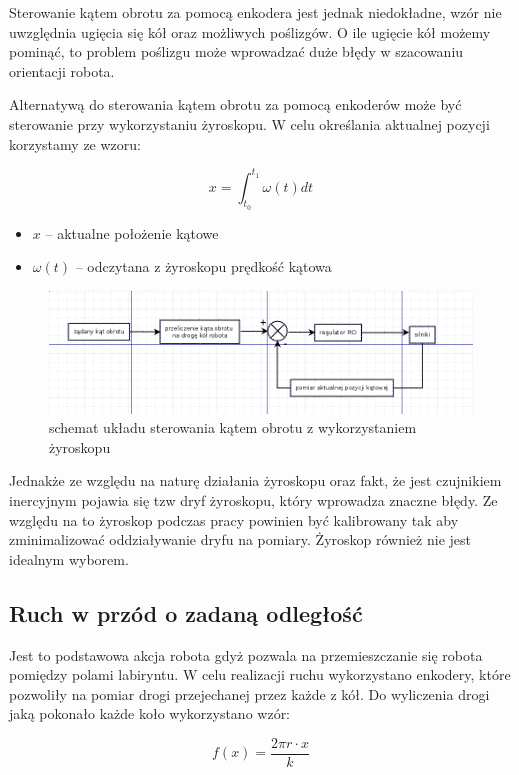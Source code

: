 \documentclass[12pt,a4paper,twoside,openright,fleqn]{mwrep}
\begin{document}
Sterowanie kątem obrotu za pomocą enkodera jest jednak niedokładne, wzór nie uwzględnia ugięcia się kół oraz możliwych poślizgów. O ile ugięcie kół możemy pominąć, to problem poślizgu może wprowadzać duże błędy w szacowaniu orientacji robota. 

Alternatywą do sterowania kątem obrotu za pomocą enkoderów może być sterowanie przy wykorzystaniu żyroskopu. W celu określania aktualnej pozycji korzystamy ze wzoru:

$$ x = \int_{t_0}^{t_1} \omega(t) dt $$

\begin{itemize}
   \item $x$ -- aktualne położenie kątowe
   \item $\omega(t)$ -- odczytana z żyroskopu prędkość kątowa
\end{itemize}

\begin{figure}[h]
\centering
\includegraphics[width=1.0\textwidth]{./images/zyroskop_uklad_sterowania}
\caption{schemat układu sterowania kątem obrotu z wykorzystaniem żyroskopu}
\label{zyroskop_uklad_sterowania}
\end{figure}

Jednakże ze względu na naturę działania żyroskopu oraz fakt, że jest czujnikiem inercyjnym pojawia się tzw dryf żyroskopu, który wprowadza znaczne błędy. Ze względu na to żyroskop podczas pracy powinien być kalibrowany tak aby zminimalizować oddziaływanie dryfu na pomiary. Żyroskop również nie jest idealnym wyborem. 


\subsection{Ruch w przód o zadaną odległość} %

Jest to podstawowa akcja robota gdyż pozwala na przemieszczanie się robota pomiędzy polami labiryntu. W celu realizacji ruchu wykorzystano enkodery, które pozwoliły na pomiar drogi przejechanej przez każde z kół. Do wyliczenia drogi jaką pokonało każde koło wykorzystano wzór:

$$ f(x) = \frac{2 \pi r \cdot x} {k}$$
\end{document}
